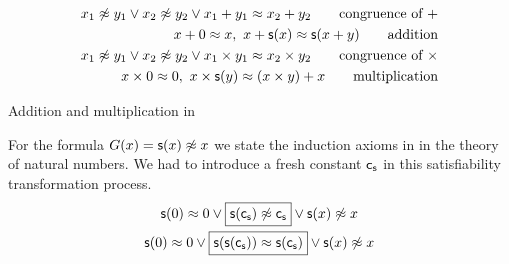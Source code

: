 \begin{table}[hbt]
	\begin{align*}
		x_1\not\approx y_1\lor x_2\not\approx y_2\lor x_1+y_1 \approx x_2+y_2
		\tag*{congruence of \( + \)}
		\\
		x + 0 \approx x,\
		x+\mathsf{s}(x) \approx \mathsf{s}(x+y)
		\tag*{addition}
		\\
		x_1\not\approx y_1\lor x_2\not\approx y_2\lor x_1\times y_1 \approx x_2\times y_2
		\tag*{congruence of \( \times \)}
		\\
		x \times 0 \approx 0,\
		x \times\mathsf{s}(y) \approx (x\times y) + x
		\tag*{multiplication}
	\end{align*}
	\caption{Addition and multiplication in \CNF}\label{tab:addition:multiplication}
\end{table}

\begin{example} For the formula \( G(x)=\mathsf{s}(x)\not\approx x \) we state the induction axioms in \CNF{} in the theory of natural numbers.
	We had to introduce a fresh constant \( \mathsf{c}_{\mathsf{s}} \) in this satisfiability transformation process.
	\begin{gather*}
	\mathsf{s}(0)\approx 0 \lor \boxed{\mathsf{s}(\mathsf{c}_{\mathsf{s}})\not\approx \mathsf{c}_{\mathsf{s}}} \lor \mathsf{s}(x)\not\approx x \\
	\mathsf{s}(0)\approx 0 \lor \boxed{\mathsf{s}(\mathsf{s}(\mathsf{c}_{\mathsf{s}}))\approx \mathsf{s}(\mathsf{c}_{\mathsf{s}})} \lor \mathsf{s}(x)\not\approx x
	\end{gather*}
\end{example}


